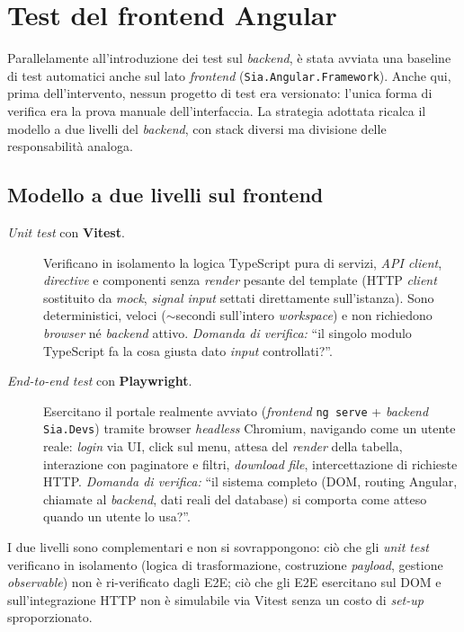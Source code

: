 \section{Test del frontend Angular}

Parallelamente all'introduzione dei test sul \emph{backend}, è stata avviata una baseline di test automatici anche sul lato \emph{frontend} (\texttt{Sia.Angular.Framework}). Anche qui, prima dell'intervento, nessun progetto di test era versionato: l'unica forma di verifica era la prova manuale dell'interfaccia. La strategia adottata ricalca il modello a due livelli del \emph{backend}, con stack diversi ma divisione delle responsabilità analoga.

\subsection{Modello a due livelli sul frontend}

\begin{description}
    \item[\emph{Unit test} con \textbf{Vitest}.] Verificano in isolamento la logica TypeScript pura di servizi, \emph{API client}, \emph{directive} e componenti senza \emph{render} pesante del template (HTTP \emph{client} sostituito da \emph{mock}, \emph{signal input} settati direttamente sull'istanza). Sono deterministici, veloci ($\sim$secondi sull'intero \emph{workspace}) e non richiedono \emph{browser} né \emph{backend} attivo. \emph{Domanda di verifica:} ``il singolo modulo TypeScript fa la cosa giusta dato \emph{input} controllati?''.
    \item[\emph{End-to-end test} con \textbf{Playwright}.] Esercitano il portale realmente avviato (\emph{frontend} \texttt{ng serve} + \emph{backend} \texttt{Sia.Devs}) tramite browser \emph{headless} Chromium, navigando come un utente reale: \emph{login} via UI, click sul menu, attesa del \emph{render} della tabella, interazione con paginatore e filtri, \emph{download} \emph{file}, intercettazione di richieste HTTP. \emph{Domanda di verifica:} ``il sistema completo (DOM, routing Angular, chiamate al \emph{backend}, dati reali del database) si comporta come atteso quando un utente lo usa?''.
\end{description}

I due livelli sono complementari e non si sovrappongono: ciò che gli \emph{unit test} verificano in isolamento (logica di trasformazione, costruzione \emph{payload}, gestione \emph{observable}) non è ri-verificato dagli E2E; ciò che gli E2E esercitano sul DOM e sull'integrazione HTTP non è simulabile via Vitest senza un costo di \emph{set-up} sproporzionato.

